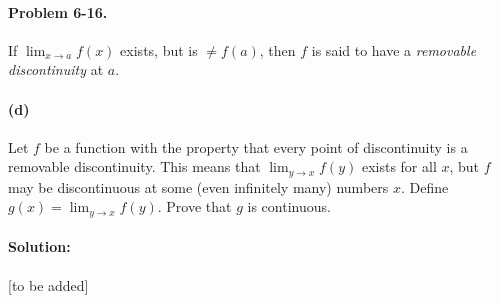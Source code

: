 \documentclass{article}
\begin{document}
\paragraph{Problem 6-16.} If $\lim_{x \rightarrow a}f(x)$ exists, but is $\neq
f(a)$, then $f$ is said to have a \emph{removable discontinuity} at $a$.

\paragraph{(d)} Let $f$ be a function with the property that every point of
discontinuity is a removable discontinuity. This means that $\lim_{y
\rightarrow x}f(y)$ exists for all $x$, but $f$ may be discontinuous at some
(even infinitely many) numbers $x$. Define $g(x) = \lim_{y \rightarrow x}f(y)$.
Prove that $g$ is continuous.

\paragraph{Solution:} [to be added]
\end{document}

